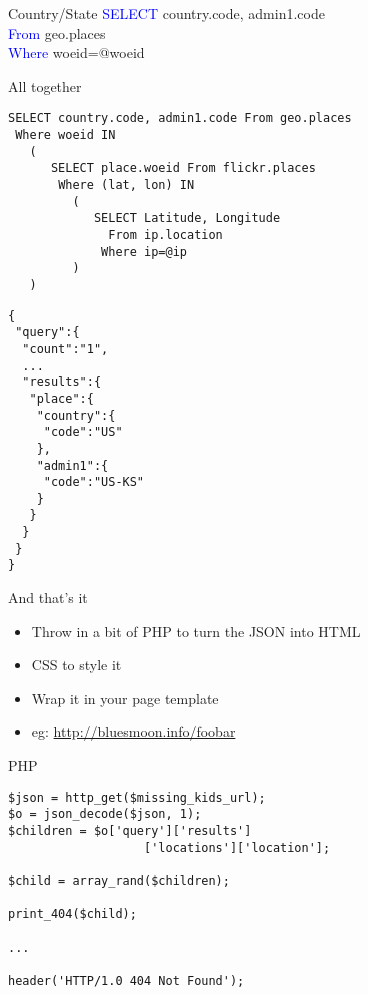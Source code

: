 \documentclass{beamer}
\begin{document}
\begin{frame}{Country/State}
\textcolor{blue}{SELECT} country.code, admin1.code \\
  \textcolor{blue}{From} geo.places \\
 \textcolor{blue}{Where} woeid=@woeid
\end{frame}

\begin{frame}[fragile]{All together}
\begin{verbatim}
SELECT country.code, admin1.code From geo.places
 Where woeid IN
   (
      SELECT place.woeid From flickr.places
       Where (lat, lon) IN
         (
            SELECT Latitude, Longitude
              From ip.location
             Where ip=@ip
         )
   )
\end{verbatim}
\end{frame}

\begin{frame}[fragile]{}
\begin{verbatim}
{
 "query":{
  "count":"1",
  ...
  "results":{
   "place":{
    "country":{
     "code":"US"
    },
    "admin1":{
     "code":"US-KS"
    }
   }
  }
 }
}
\end{verbatim}
\end{frame}

\begin{frame}{And that's it}
  \begin{itemize}
  \item Throw in a bit of PHP to turn the JSON into HTML
  \item CSS to style it
  \item Wrap it in your page template
  \item eg: \href{http://bluesmoon.info/foobar}{http://bluesmoon.info/foobar}
  \end{itemize}
\end{frame}

\begin{frame}[fragile]{PHP}
\begin{verbatim}
$json = http_get($missing_kids_url);
$o = json_decode($json, 1);
$children = $o['query']['results']
                   ['locations']['location'];

$child = array_rand($children);

print_404($child);

...

header('HTTP/1.0 404 Not Found');

\end{verbatim}
\end{frame}
\end{document}
